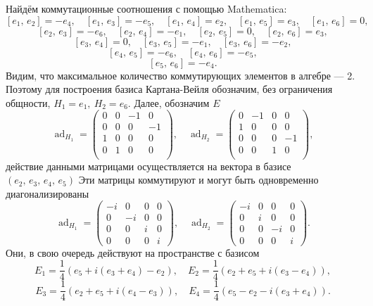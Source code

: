 \documentclass[a4paper]{article}
\begin{document}
Найдём коммутационные соотношения с помощью Mathematica:
\[
\left[ e_1,\,e_2 \right] =-e_4,\quad
\left[ e_1,\,e_3 \right] =-e_5,\quad
\left[ e_1,\,e_4 \right] =e_2,\quad
\left[ e_1,\,e_5 \right] =e_3,\quad
\left[ e_1,\,e_6 \right] =0,
\] 
\[
\left[ e_2,\,e_3 \right] =-e_6,\quad
\left[ e_2,\,e_4 \right] =-e_1,\quad
\left[ e_2,\,e_5 \right] =0,\quad
\left[ e_2,\,e_6 \right] =e_3,
\] 
\[
\left[ e_3,\,e_4 \right] =0,\quad
\left[ e_3,\,e_5 \right] =-e_1,\quad
\left[ e_3,\,e_6 \right] =-e_2,
\] 
\[
\left[ e_4,\,e_5 \right] =-e_6,\quad
\left[ e_4,\,e_6 \right] =-e_5,
\] 
\[
\left[ e_5,\,e_6 \right] =-e_4
.\] 
Видим, что максимальное количество коммутирующих элементов
в алгебре --- 2. Поэтому для построения базиса Картана-Вейля
обозначим, без ограничения общности, $H_1=e_1,\ H_2=e_6$.
Далее, обозначим $E$
 \[
\operatorname{ad}_{H_1}=\left(
\begin{array}{cccc}
 0 & 0 & -1 & 0 \\
 0 & 0 & 0 & -1 \\
 1 & 0 & 0 & 0 \\
 0 & 1 & 0 & 0 \\
\end{array}
\right),\quad
\operatorname{ad}_{H_2}=\left(
\begin{array}{cccc}
 0 & -1 & 0 & 0 \\
 1 & 0 & 0 & 0 \\
 0 & 0 & 0 & -1 \\
 0 & 0 & 1 & 0 \\
\end{array}
\right),\]
действие данными матрицами осуществляется на вектора в базисе $\left( e_2,\,e_3,\,e_4,\,e_5 \right) $
Эти матрицы коммутируют и могут быть одновременно диагонализированы
\[
\operatorname{ad}_{H_1}=
\begin{pmatrix} -i& 0& 0&0\\
0&-i&0&0\\
0&0&i&0\\
0&0&0&i\end{pmatrix} ,\quad
\operatorname{ad}_{H_2}=
\begin{pmatrix} -i& 0& 0&0\\
0&i&0&0\\
0&0&-i&0\\
0&0&0&i\end{pmatrix} 
.\] 
Они, в свою очередь действуют на пространстве с базисом
\[
E_1=\frac{1}{4}\left( e_5+i(e_3+e_4)-e_2 \right) ,\quad E_2=\frac{1}{4}\left( e_2+e_5+i(e_3-e_4) \right) 
,\] 
\[
E_3=\frac{1}{4}\left( e_2+e_5+i(e_4-e_3) \right) ,\quad
E_4=\frac{1}{4}\left( e_5-e_2-i(e_3+e_4) \right) 
.\] 
\end{document}
